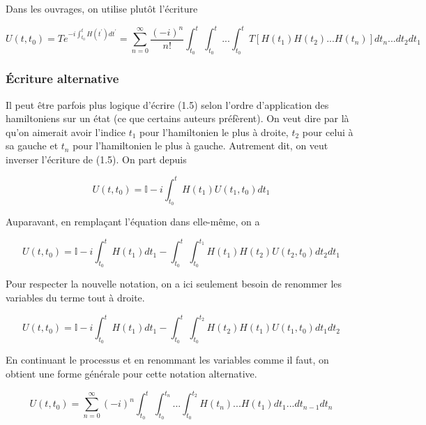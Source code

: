 Dans les ouvrages, on utilise plutôt l'écriture

\begin{equation}
    U(t,t_0) = Te^{-i\int_{t_0}^{t}H(t^{'})dt^{'}} = \sum_{n=0}^{\infty}\frac{(-i)^n}{n!}\int_{t_0}^{t}\int_{t_0}^{t}...\int_{t_0}^{t} T \left[H(t_1)H(t_2)...H(t_n)\right]dt_n ... dt_2 dt_1
\end{equation}

\subsubsection{Écriture alternative}
Il peut être parfois plus logique d'écrire (1.5) selon l'ordre d'application des hamiltoniens sur un état (ce que certains auteurs préfèrent). On veut dire par là qu'on aimerait avoir l'indice $t_1$ pour l'hamiltonien le plus à droite, $t_2$ pour celui à sa gauche et $t_n$ pour l'hamiltonien le plus à gauche. Autrement dit, on veut inverser l'écriture de (1.5). On part depuis 

\begin{equation*}
    U(t,t_0) = \mathbb{I} -i\int_{t_0}^{t}H(t_1)U(t_1,t_0)dt_1
\end{equation*}

Auparavant, en remplaçant l'équation dans elle-même, on a 

\begin{equation*}
    U(t,t_0) = \mathbb{I} -i\int_{t_0}^{t}H(t_1)dt_1 - \int_{t_0}^{t}\int_{t_0}^{t_1}H(t_1)H(t_2)U(t_2,t_0)dt_2dt_1
\end{equation*}

Pour respecter la nouvelle notation, on a ici seulement besoin de renommer les variables du terme tout à droite.

\begin{equation*}
    U(t,t_0) = \mathbb{I} -i\int_{t_0}^{t}H(t_1)dt_1 - \int_{t_0}^{t}\int_{t_0}^{t_2}H(t_2)H(t_1)U(t_1,t_0)dt_1dt_2
\end{equation*}

En continuant le processus et en renommant les variables comme il faut, on obtient une forme générale pour cette notation alternative.

\begin{equation}
    U(t,t_0) = \sum_{n=0}^{\infty} (-i)^n \int_{t_0}^{t}\int_{t_0}^{t_n}...\int_{t_0}^{t_2}H(t_n)...H(t_1)dt_1 ... dt_{n-1} dt_n
\end{equation}



